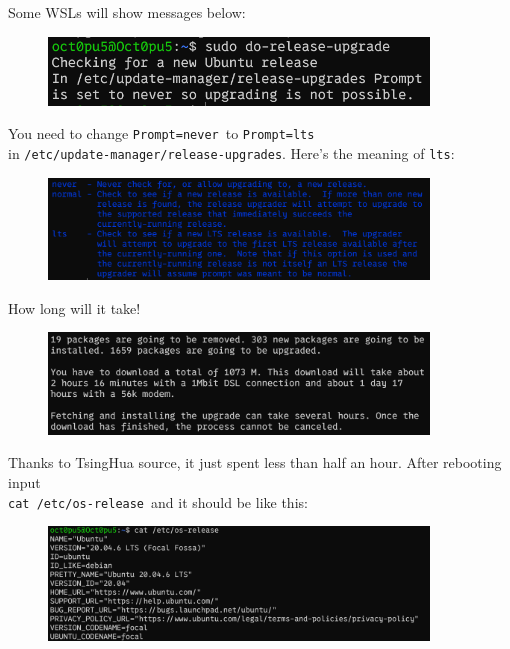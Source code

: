 \documentclass[12pt]{ctexart}
\newenvironment{mdquote}
{%
  \par\noindent
  \begin{list}{}{%
      \setlength{\leftmargin}{1em}%
      \setlength{\rightmargin}{0pt}%
      \setlength{\itemindent}{0pt}%
      \setlength{\listparindent}{\parindent}%
      \setlength{\topsep}{0.5\baselineskip}%
  }
  \item[\textbf{>}\ ]\itshape
}
{\end{list}\par}
\begin{document}
\begin{mdquote}
Some WSLs will show messages below:


\begin{figure}[H]
    \centering
    \includegraphics[width=0.9\textwidth,keepaspectratio]{assets/Linux/2.3 I upgraded alone/1.png}
\end{figure}

You need to change \texttt{Prompt=never}\ to \texttt{Prompt=lts}\\
in \texttt{/etc/update-manager/release-upgrades}. Here's
the meaning of \texttt{lts}:

\begin{figure}[H]
    \centering
    \includegraphics[width=0.9\textwidth,keepaspectratio]{assets/Linux/2.3 I upgraded alone/2.png}
\end{figure}

\end{mdquote}

How long will it take!

\begin{figure}[H]
    \centering
    \includegraphics[width=0.9\textwidth,keepaspectratio]{assets/Linux/2.3 I upgraded alone/3.png}
\end{figure}


Thanks to TsingHua source, it just spent less than half an hour. After
rebooting input\\ \texttt{cat\ /etc/os-release}\ and it should be like
this:

\begin{figure}[H]
    \centering
    \includegraphics[width=0.9\textwidth,keepaspectratio]{assets/Linux/2.3 I upgraded alone/4.png}
\end{figure}
\end{document}
